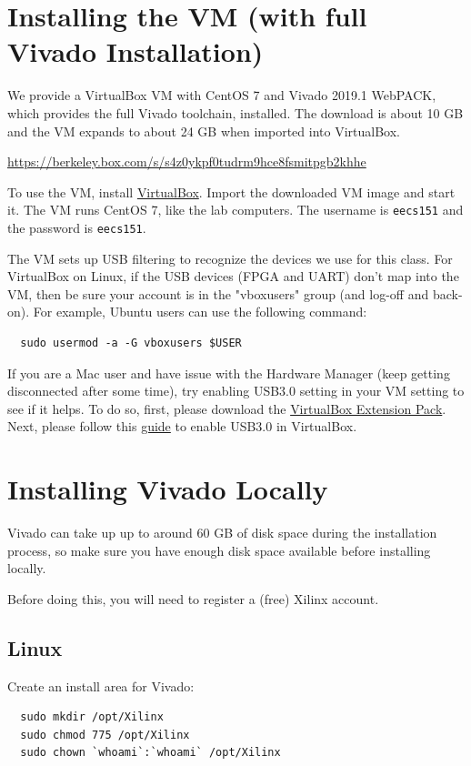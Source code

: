 \documentclass[11pt]{article}
\begin{document}
\newpage
\appendix
\appendixpage
\section{Installing the VM (with full Vivado Installation)}
\label{section:vm}
We provide a VirtualBox VM with CentOS 7 and Vivado 2019.1 WebPACK, which provides the full Vivado toolchain, installed. The download is about 10 GB and the VM expands to about 24 GB when imported into VirtualBox.

\url{https://berkeley.box.com/s/s4z0ykpf0tudrm9hce8fsmitpgb2khhe}

To use the VM, install \href{https://www.virtualbox.org/}{VirtualBox}. Import the downloaded VM image and start it. The VM runs CentOS 7, like the lab computers. The username is \texttt{eecs151} and the password is \texttt{eecs151}.

The VM sets up USB filtering to recognize the devices we use for this class. For VirtualBox on Linux, if the USB devices (FPGA and UART) don't map into the VM, then be sure your account is in the "vboxusers" group (and log-off and back-on). For example, Ubuntu users can use the following command:

\begin{verbatim}
  sudo usermod -a -G vboxusers $USER
\end{verbatim}

If you are a Mac user and have issue with the Hardware Manager (keep getting disconnected after some time), try enabling USB3.0 setting in your VM setting to see if it helps. To do so, first, please download the \href{https://www.oracle.com/virtualization/technologies/vm/downloads/virtualbox-downloads.html#extpack}{VirtualBox Extension Pack}. Next, please follow this \href{https://techspite.com/how-to-install-virtualbox-extension-pack-and-enable-usb-3-0-2/}{guide} to enable USB3.0 in VirtualBox.

\section{Installing Vivado Locally}
\label{section:localvivado}

Vivado can take up up to around 60 GB of disk space during the installation process, so make sure you have enough disk space available before installing locally.

Before doing this, you will need to register a (free) Xilinx account.

\subsection{Linux}
Create an install area for Vivado:
\begin{verbatim}
  sudo mkdir /opt/Xilinx
  sudo chmod 775 /opt/Xilinx
  sudo chown `whoami`:`whoami` /opt/Xilinx
\end{verbatim}
\end{document}
